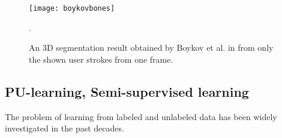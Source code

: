 \begin{figure}[ht]
	\centering
	\texttt{[image: boykovbones]}
	\caption{An 3D segmentation result obtained by Boykov et al. in \cite{boykov2006graph} from only the shown user strokes from one frame.}.
	\label{fig:boykovbones}
\end{figure}

\subsection{PU-learning, Semi-supervised learning}
The problem of learning from labeled and unlabeled data has been widely investigated in the past decades. 
